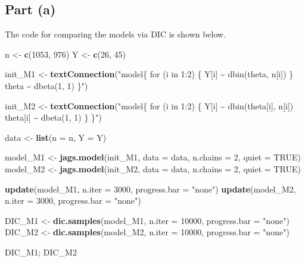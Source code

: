 \documentclass[
]{homework}
\newenvironment{Shaded}{\begin{snugshade}}{\end{snugshade}}
\newcommand{\AttributeTok}[1]{\textcolor[rgb]{0.13,0.29,0.53}{#1}}
\newcommand{\ConstantTok}[1]{\textcolor[rgb]{0.56,0.35,0.01}{#1}}
\newcommand{\DecValTok}[1]{\textcolor[rgb]{0.00,0.00,0.81}{#1}}
\newcommand{\FunctionTok}[1]{\textcolor[rgb]{0.13,0.29,0.53}{\textbf{#1}}}
\newcommand{\NormalTok}[1]{#1}
\newcommand{\OtherTok}[1]{\textcolor[rgb]{0.56,0.35,0.01}{#1}}
\newcommand{\StringTok}[1]{\textcolor[rgb]{0.31,0.60,0.02}{#1}}
\begin{document}
\subsection{Part (a)}\label{part-a-2}

The code for comparing the models via DIC is shown below.

\begin{Shaded}
\begin{Highlighting}[]
\NormalTok{n }\OtherTok{\textless{}{-}} \FunctionTok{c}\NormalTok{(}\DecValTok{1053}\NormalTok{, }\DecValTok{976}\NormalTok{)}
\NormalTok{Y }\OtherTok{\textless{}{-}} \FunctionTok{c}\NormalTok{(}\DecValTok{26}\NormalTok{, }\DecValTok{45}\NormalTok{)}

\NormalTok{init\_M1 }\OtherTok{\textless{}{-}} \FunctionTok{textConnection}\NormalTok{(}\StringTok{"model\{}
\StringTok{  for (i in 1:2) \{ }
\StringTok{    Y[i] \textasciitilde{} dbin(theta, n[i]) }
\StringTok{  \}}
\StringTok{  theta \textasciitilde{} dbeta(1, 1)}
\StringTok{\}"}\NormalTok{)}

\NormalTok{init\_M2 }\OtherTok{\textless{}{-}} \FunctionTok{textConnection}\NormalTok{(}\StringTok{"model\{}
\StringTok{  for (i in 1:2) \{ }
\StringTok{    Y[i] \textasciitilde{} dbin(theta[i], n[i]) }
\StringTok{    theta[i] \textasciitilde{} dbeta(1, 1)}
\StringTok{  \}}
\StringTok{\}"}\NormalTok{)}

\NormalTok{data }\OtherTok{\textless{}{-}} \FunctionTok{list}\NormalTok{(}\AttributeTok{n =}\NormalTok{ n, }\AttributeTok{Y =}\NormalTok{ Y)}

\NormalTok{model\_M1 }\OtherTok{\textless{}{-}} \FunctionTok{jags.model}\NormalTok{(init\_M1, }\AttributeTok{data =}\NormalTok{ data, }\AttributeTok{n.chains =} \DecValTok{2}\NormalTok{, }\AttributeTok{quiet =} \ConstantTok{TRUE}\NormalTok{)}
\NormalTok{model\_M2 }\OtherTok{\textless{}{-}} \FunctionTok{jags.model}\NormalTok{(init\_M2, }\AttributeTok{data =}\NormalTok{ data, }\AttributeTok{n.chains =} \DecValTok{2}\NormalTok{, }\AttributeTok{quiet =} \ConstantTok{TRUE}\NormalTok{)}

\FunctionTok{update}\NormalTok{(model\_M1, }\AttributeTok{n.iter =} \DecValTok{3000}\NormalTok{, }\AttributeTok{progress.bar =} \StringTok{"none"}\NormalTok{)}
\FunctionTok{update}\NormalTok{(model\_M2, }\AttributeTok{n.iter =} \DecValTok{3000}\NormalTok{, }\AttributeTok{progress.bar =} \StringTok{"none"}\NormalTok{)}

\NormalTok{DIC\_M1 }\OtherTok{\textless{}{-}} \FunctionTok{dic.samples}\NormalTok{(model\_M1, }\AttributeTok{n.iter =} \DecValTok{10000}\NormalTok{, }\AttributeTok{progress.bar =} \StringTok{"none"}\NormalTok{)}
\NormalTok{DIC\_M2 }\OtherTok{\textless{}{-}} \FunctionTok{dic.samples}\NormalTok{(model\_M2, }\AttributeTok{n.iter =} \DecValTok{10000}\NormalTok{, }\AttributeTok{progress.bar =} \StringTok{"none"}\NormalTok{)}

\NormalTok{DIC\_M1; DIC\_M2}
\end{Highlighting}
\end{Shaded}
\end{document}
